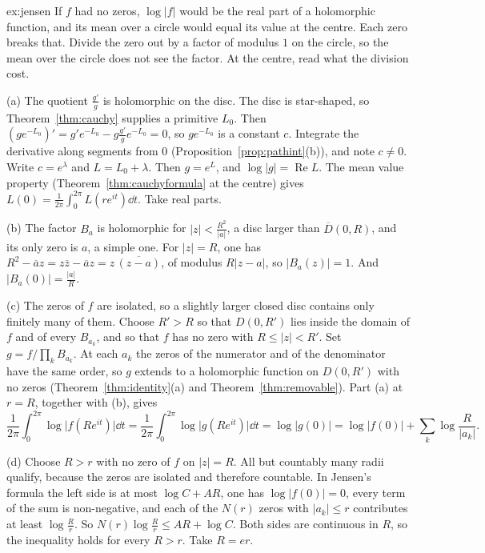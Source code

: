 \begin{solution}{ex:jensen}
\idea If $f$ had no zeros, $\log|f|$ would be the real part of a holomorphic function, and its mean over a circle would equal its value at the centre. Each zero breaks that. Divide the zero out by a factor of modulus $1$ on the circle, so the mean over the circle does not see the factor. At the centre, read what the division cost.

\writeup (a) The quotient $\frac{g'}g$ is holomorphic on the disc. The disc is star-shaped, so Theorem~\ref{thm:cauchy} supplies a primitive $L_0$. Then $(ge^{-L_0})'=g'e^{-L_0}-g\frac{g'}ge^{-L_0}=0$, so $ge^{-L_0}$ is a constant $c$. Integrate the derivative along segments from $0$ (Proposition~\ref{prop:pathint}(b)), and note $c\ne0$. Write $c=e^\lambda$ and $L=L_0+\lambda$. Then $g=e^L$, and $\log|g|=\operatorname{Re}L$. The mean value property (Theorem~\ref{thm:cauchyformula} at the centre) gives $L(0)=\frac1{2\pi}\int_0^{2\pi}L(re^{it})\dd t$. Take real parts.

(b) The factor $B_a$ is holomorphic for $|z|<\frac{R^2}{|a|}$, a disc larger than $\overline D(0,R)$, and its only zero is $a$, a simple one. For $|z|=R$, one has $R^2-\overline az=z\overline z-\overline az=z\,\overline{(z-a)}$, of modulus $R|z-a|$, so $|B_a(z)|=1$. And $|B_a(0)|=\frac{|a|}R$.

(c) The zeros of $f$ are isolated, so a slightly larger closed disc contains only finitely many of them. Choose $R'>R$ so that $D(0,R')$ lies inside the domain of $f$ and of every $B_{a_k}$, and so that $f$ has no zero with $R\le|z|<R'$. Set $g=f/\prod_kB_{a_k}$. At each $a_k$ the zeros of the numerator and of the denominator have the same order, so $g$ extends to a holomorphic function on $D(0,R')$ with no zeros (Theorem~\ref{thm:identity}(a) and Theorem~\ref{thm:removable}). Part (a) at $r=R$, together with (b), gives
\[
\frac1{2\pi}\int_0^{2\pi}\log\bigl|f(Re^{it})\bigr|\dd t=\frac1{2\pi}\int_0^{2\pi}\log\bigl|g(Re^{it})\bigr|\dd t=\log|g(0)|=\log|f(0)|+\sum_k\log\frac R{|a_k|}.
\]

(d) Choose $R>r$ with no zero of $f$ on $|z|=R$. All but countably many radii qualify, because the zeros are isolated and therefore countable. In Jensen's formula the left side is at most $\log C+AR$, one has $\log|f(0)|=0$, every term of the sum is non-negative, and each of the $N(r)$ zeros with $|a_k|\le r$ contributes at least $\log\frac Rr$. So $N(r)\log\frac Rr\le AR+\log C$. Both sides are continuous in $R$, so the inequality holds for every $R>r$. Take $R=er$.


\end{solution}
